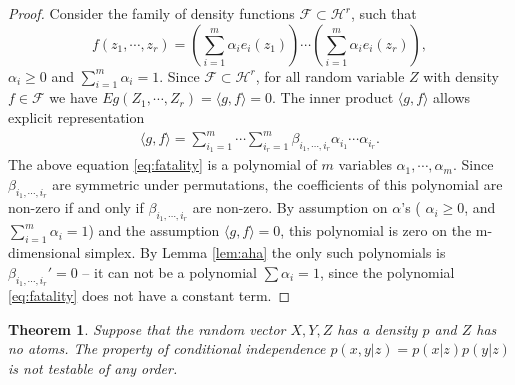 \documentclass{article}
\newtheorem{Theorem}{Theorem}
\begin{document}
\begin{proof}
Consider the family of density functions  $\mathcal F \subset \mathcal H^r$, such that  
\[
f(z_1,\cdots,z_r)= (\sum_{i=1}^{m} \alpha_i e_i(z_1)) \cdots (\sum_{i=1}^{m} \alpha_i e_i(z_r)),
\]
$\alpha_i \geq 0$ and $\sum_{i=1}^m \alpha_i=1$. Since $\mathcal F \subset \mathcal H^r$, for all random variable $Z$ with density  $f \in \mathcal{F}$ we have $E g(Z_1,\cdots ,Z_r) = \langle g, f \rangle =0$. The inner product $\langle g, f \rangle$ allows explicit representation  
\begin{align}
\label{eq:fatality}
\langle g, f \rangle = \sum_{i_1=1}^{m} \cdots  \sum_{i_r=1}^{m} \beta_{i_1,\cdots, i_r} \alpha_{i_1} \cdots \alpha_{i_r}.
\end{align}
The above equation \eqref{eq:fatality} is a polynomial of $m$ variables $\alpha_{1},\cdots,\alpha_{m}$. Since $\beta_{i_1,\cdots, i_r}$ are symmetric under permutations, the coefficients of this polynomial are non-zero if and only if $\beta_{i_1,\cdots, i_r}$ are non-zero. By assumption on $\alpha$'s ( $\alpha_i \geq 0$, and $\sum_{i=1}^m \alpha_i=1$) and the assumption $\langle g, f \rangle =0$, this polynomial is zero on the m-dimensional simplex. By Lemma \ref{lem:aha} the only such polynomials is $\beta_{i_1, \cdots ,i_r}'=0$ -- it can not be a polynomial $\sum \alpha_i=1$, since the polynomial \eqref{eq:fatality} does not have a constant term. 
\end{proof}





\begin{Theorem}
\label{th:1}
 Suppose that the random vector $X,Y,Z$ has a density $p$ and $Z$ has no atoms. The property of conditional independence $p(x,y|z) = p(x|z)p(y|z)$ is not testable of any order. 
\end{Theorem}
\end{document}

